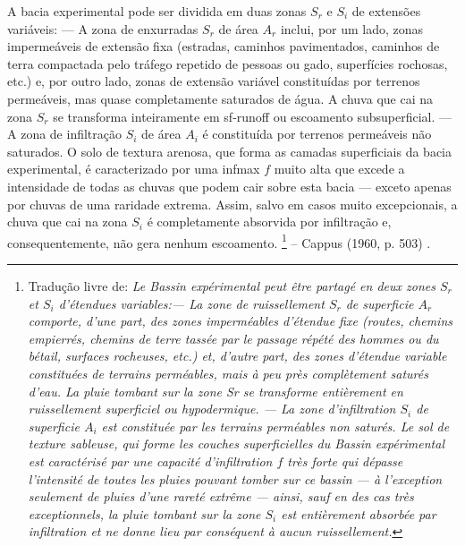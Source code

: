 \documentclass[./main.tex]{subfiles}
\begin{document}
\begin{adjustwidth}{100pt}{0pt}
\medskip
\small
A bacia experimental pode ser dividida em duas zonas \(S_r\) e \(S_i\) de extensões variáveis: --- A zona de enxurradas \(S_r\) de área \(A_r\) inclui, por um lado, zonas impermeáveis de extensão fixa (estradas, caminhos pavimentados, caminhos de terra compactada pelo tráfego repetido de pessoas ou gado, superfícies rochosas, etc.) e, por outro lado, zonas de extensão variável constituídas por terrenos permeáveis, mas quase completamente saturados de água. A chuva que cai na zona \(S_r\) se transforma inteiramente em \gls{sf-runoff} ou escoamento subsuperficial. --- A zona de infiltração \(S_i\) de área \(A_i\) é constituída por terrenos permeáveis não saturados. O solo de textura arenosa, que forma as camadas superficiais da bacia experimental, é caracterizado por uma \gls{infmax} \(f\) muito alta que excede a intensidade de todas as chuvas que podem cair sobre esta bacia — exceto apenas por chuvas de uma raridade extrema. Assim, salvo em casos muito excepcionais, a chuva que cai na zona \(S_i\) é completamente absorvida por infiltração e, consequentemente, não gera nenhum escoamento.
\footnote{Tradução livre de: 
\textit{
Le Bassin expérimental peut être partagé en deux zones $S_r$ et $S_i$ d'étendues variables:\;--- La zone de ruissellement $S_r$ de superficie $A_r$ comporte, d'une part, des zones imperméables d'étendue fixe (routes, chemins empierrés, chemins de terre tassée par le passage répété des hommes ou du bétail, surfaces rocheuses, etc.) et, d'autre part, des zones d'étendue variable constituées de terrains perméables, mais à peu près complètement saturés d'eau. La pluie tombant sur la zone Sr se transforme entièrement en ruissellement superficiel ou hypodermique. --- La zone d'infiltration $S_i$ de superficie $A_i$ est constituée par les terrains perméables non saturés. Le sol de texture sableuse, qui forme les couches superficielles du Bassin expérimental est caractérisé par une capacité d'infiltration $f$ très forte qui dépasse l'intensité de toutes les pluies pouvant tomber sur ce bassin — à l'exception seulement de pluies d'une rareté extrême — ainsi, sauf en des cas très exceptionnels, la pluie tombant sur la zone $S_i$ est entièrement absorbée par infiltration et ne donne lieu par conséquent à aucun ruissellement.
}} -- Cappus (1960, p. 503) \cite{Cappus1960}.
\medskip
\end{adjustwidth}
\end{document}
